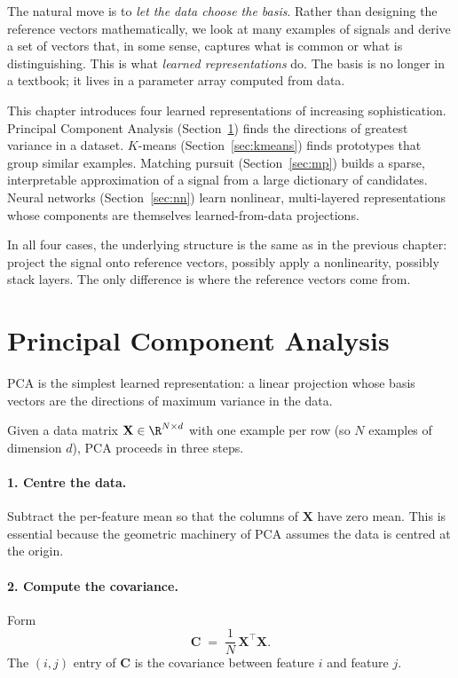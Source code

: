 The natural move is to \emph{let the data choose the basis}.  Rather
than designing the reference vectors mathematically, we look at many
examples of signals and derive a set of vectors that, in some sense,
captures what is common or what is distinguishing.  This is what
\emph{learned representations} do.  The basis is no longer in a textbook;
it lives in a parameter array computed from data.

This chapter introduces four learned representations of increasing
sophistication.  Principal Component Analysis (Section~\ref{sec:pca})
finds the directions of greatest variance in a dataset.  $K$-means
(Section~\ref{sec:kmeans}) finds prototypes that group similar
examples.  Matching pursuit (Section~\ref{sec:mp}) builds a sparse,
interpretable approximation of a signal from a large dictionary of
candidates.  Neural networks (Section~\ref{sec:nn}) learn nonlinear,
multi-layered representations whose components are themselves
learned-from-data projections.

In all four cases, the underlying structure is the same as in the
previous chapter: project the signal onto reference vectors, possibly
apply a nonlinearity, possibly stack layers.  The only difference is
where the reference vectors come from.

\section{Principal Component Analysis}
\label{sec:pca}

PCA is the simplest learned representation: a linear projection whose
basis vectors are the directions of maximum variance in the data.

Given a data matrix $\mathbf{X} \in \R^{N \times d}$ with one example per
row (so $N$ examples of dimension $d$), PCA proceeds in three steps.

\paragraph{1. Centre the data.}  Subtract the per-feature mean so that
the columns of $\mathbf{X}$ have zero mean.  This is essential because
the geometric machinery of PCA assumes the data is centred at the
origin.

\paragraph{2. Compute the covariance.}  Form
\begin{equation}
    \mathbf{C} \;=\; \frac{1}{N}\, \mathbf{X}^\top \mathbf{X}.
\end{equation}
The $(i, j)$ entry of $\mathbf{C}$ is the covariance between feature $i$
and feature $j$.

